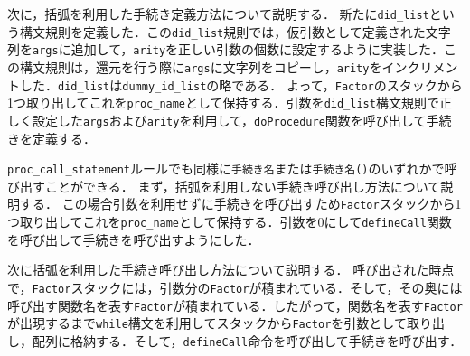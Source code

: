 \documentclass[uplatex]{jsarticle}
\begin{document}
次に，括弧を利用した手続き定義方法について説明する．
新たに\verb#did_list#という構文規則を定義した．この\verb#did_list#規則では，仮引数として定義された文字列を\verb#args#に追加して，\verb#arity#を正しい引数の個数に設定するように実装した．この構文規則は，還元を行う際に\verb#args#に文字列をコピーし，\verb#arity#をインクリメントした．\verb#did_list#は\verb#dummy_id_list#の略である．
よって，\verb#Factor#のスタックから1つ取り出してこれを\verb#proc_name#として保持する．引数を\verb#did_list#構文規則で正しく設定した\verb#args#および\verb#arity#を利用して，\verb#doProcedure#関数を呼び出して手続きを定義する．

\verb#proc_call_statement#ルールでも同様に\verb#手続き名#または\verb#手続き名()#のいずれかで呼び出すことができる．
まず，括弧を利用しない手続き呼び出し方法について説明する．
この場合引数を利用せずに手続きを呼び出すため\verb#Factor#スタックから1つ取り出してこれを\verb#proc_name#として保持する．引数を0にして\verb#defineCall#関数を呼び出して手続きを呼び出すようにした．

次に括弧を利用した手続き呼び出し方法について説明する．
呼び出された時点で，\verb#Factor#スタックには，引数分の\verb#Factor#が積まれている．そして，その奥には呼び出す関数名を表す\verb#Factor#が積まれている．したがって，関数名を表す\verb#Factor#が出現するまで\verb#while#構文を利用してスタックから\verb#Factor#を引数として取り出し，配列に格納する．そして，\verb#defineCall#命令を呼び出して手続きを呼び出す．
\end{document}
